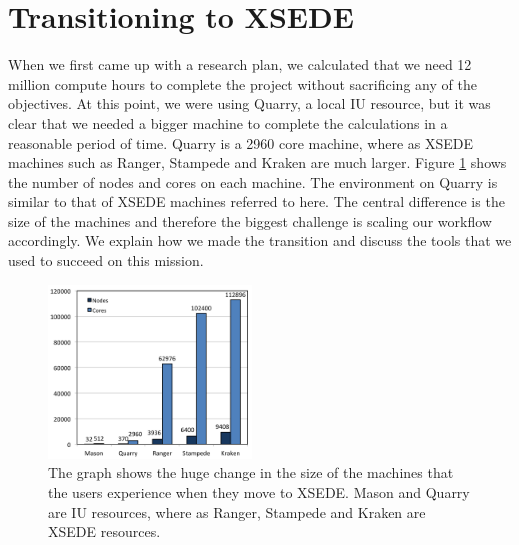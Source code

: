 \documentclass{sig-alternate}
\newcommand{\abhi}[1]{ {\textcolor{red} { ***Abhinav: #1 }}}
\newcommand{\abhi}[1]{ {}}
\begin{document}
\section{Transitioning to XSEDE}\label{sec:resources}
When we first came up with a research plan, we calculated that we need 12 million compute hours to complete the project without sacrificing any of the objectives. At this point, we were using Quarry, a local IU resource, but it was clear that we needed a bigger machine to complete the calculations in a reasonable period of time. Quarry is a 2960 core machine, where as XSEDE machines such as Ranger, Stampede and Kraken are much larger. Figure \ref{fig:scaling} shows the number of nodes and cores on each machine. The environment on Quarry is similar to that of XSEDE machines referred to here. The central difference is the size of the machines and therefore the biggest challenge is scaling our workflow accordingly. We explain how we made the transition and discuss the tools that we used to succeed on this mission.
%


\begin{figure} %
\centering
\includegraphics[width=0.48\textwidth]{figures/cores-nodes.png}
\caption{The graph shows the huge change in the size of the machines that the users experience when they move to XSEDE. Mason and Quarry are IU resources, where as Ranger, Stampede and Kraken are XSEDE resources. }
\label{fig:scaling}
\end{figure}
\end{document}
